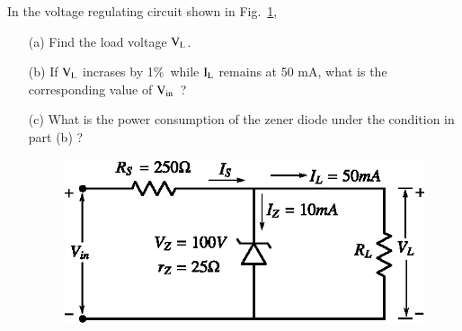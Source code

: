 \begin{problem}\label{prob1.34}
In the voltage regulating circuit shown in Fig.~\ref{fig1.54},
\begin{itemize}
\item[(a)] Find the load voltage $\textrm{V}_{\textrm{L}}$.

\item[(b)] If $\textrm{V}_{\textrm{L}}$ incrases by 1\%\ while $\textrm{I}_{\textrm{L}}$ remains at 50 mA, what is the corresponding value of $\textrm{V}_{\text{in}}$~?

\eject

\item[(c)] What is the power consumption of the zener diode under the condition in part (b) ?
\begin{figure}[H]
\centering
\includegraphics{chap1/fig1.54.eps}
\caption{}\label{fig1.54}
\end{figure}
\end{itemize}
\end{problem}


